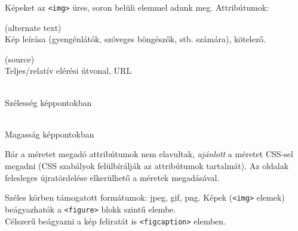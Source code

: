 \documentclass[usenames,dvipsnames,aspectratio=169]{beamer}
\begin{document}
\begin{frame}
  Képeket az \texttt{<img>} üres, soron belüli elemmel adunk meg. Attribútumok:
  \begin{description}[m]
    \item[\texttt{alt}] (alternate text) \hfill \\ Kép leírása (gyengénlátók, szöveges böngészők, stb. számára), kötelező.
    \item[\texttt{src}] (source) \hfill \\ Teljes/relatív elérési útvonal, URL
    \item[\texttt{width}] \hfill \\ Szélesség képpontokban
    \item[\texttt{height}] \hfill \\ Magasság képpontokban
  \end{description}
  Bár a méretet megadó attribútumok nem elavultak, \emph{ajánlott} a méretet CSS-sel megadni (CSS szabályok felülbírálják az attribútumok tartalmát). Az oldalak felesleges újratördelése elkerülhető a méretek megadásával.
\end{frame}

\begin{frame}
  Széles körben támogatott formátumok: jpeg, gif, png.
  \vfill
  Képek (\texttt{<img>} elemek) beágyazhatók a \texttt{<figure>} blokk szintű elembe.\\
  Célszerű beágyazni a kép feliratát is \texttt{<figcaption>} elemben.
\end{frame}
\end{document}
